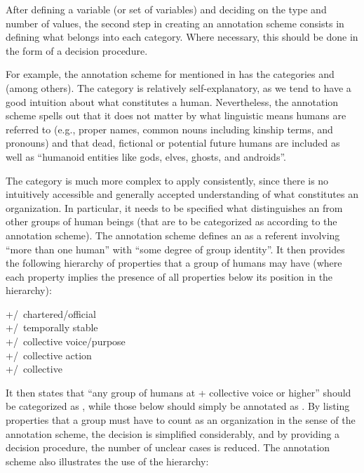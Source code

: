 After defining a variable (or set of variables) and deciding on the type and number of values, the second step in creating an annotation  scheme consists in defining what belongs into each category. Where necessary, this should be done in the form of a decision procedure.

For example, the annotation scheme for   mentioned in  \citep{garretson_coding_2004,zaenen_animacy_2004} has the categories  and  (among others). The category   is relatively self\hyp{}explanatory, as we tend to have a good intuition  about what constitutes a human. Nevertheless, the annotation  scheme spells out that it does not matter by what linguistic means humans  are referred to (e.g., proper names, common nouns  including kinship terms, and pronouns)  and that dead, fictional or potential future humans are included as well as ``humanoid entities like gods, elves, ghosts, and androids''.

The category  is much more complex to apply consistently, since there is no intuitively  accessible and generally accepted understanding of what constitutes an organization. In particular, it needs to be specified what distinguishes an  from other groups of human  beings (that are to be categorized  as  according to the annotation  scheme). The annotation  scheme defines an  as a referent involving ``more than one human'' with ``some degree of group identity''. It then provides the following hierarchy of properties that a group of humans  may have (where each property implies the presence of all properties below its position in the hierarchy):

\begin{exe}
\ex +/\textminus\ chartered/official\\
+/\textminus\ temporally stable\\
+/\textminus\ collective voice/purpose\\
+/\textminus\ collective action\\
+/\textminus\ collective
\label{ex:animacyorg}
\end{exe}

It then states that ``any group of humans  at + collective voice or higher'' should be categorized  as , while those below should simply be annotated  as .  By listing properties that a group must have to count as an organization in the sense of the annotation scheme, the decision is simplified considerably, and by providing a decision procedure, the number of unclear cases is reduced. The annotation  scheme also illustrates the use of the hierarchy:

